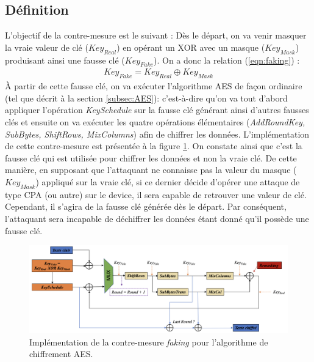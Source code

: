 \documentclass[oneside]{book}
\begin{document}
\subsection{Définition}
\label{subsec:def}

\hspace{-0.5 cm}L'objectif de la contre-mesure est le suivant : Dès le départ, on va venir masquer la vraie valeur de clé ($Key_{Real}$) en opérant un XOR avec un masque ($Key_{Mask}$) produisant ainsi une fausse clé ($Key_{Fake}$). On a donc la relation (\ref{eqn:faking}) : 
\begin{gather}
	Key_{Fake} = Key_{Real} \oplus Key_{Mask}\label{eqn:faking}
\end{gather}
À partir de cette fausse clé, on va exécuter l'algorithme AES de façon ordinaire (tel que décrit à la section \ref{subsec:AES}): c'est-à-dire qu'on va tout d'abord appliquer l'opération \textit{KeySchedule} sur la fausse clé générant ainsi d'autres fausses clés et ensuite on va exécuter les quatre opérations élémentaires (\textit{AddRoundKey, SubBytes, ShiftRows, MixColumns}) afin de chiffrer les données. L'implémentation de cette contre-mesure est présentée à la figure \ref{fig:ConceptFaking}. On constate ainsi que c'est la fausse clé qui est utilisée pour chiffrer les données et non la vraie clé. De cette manière, en supposant que l'attaquant ne connaisse pas la valeur du masque ($Key_{Mask}$) appliqué sur la vraie clé, si ce dernier décide d'opérer une attaque de type CPA (ou autre) sur le device, il sera capable de retrouver une valeur de clé. Cependant, il s'agira de la fausse clé générée dès le départ. Par conséquent, l'attaquant sera incapable de déchiffrer les données étant donné qu'il possède une fausse clé. \\

\begin{figure}[htbp]
    \hspace{-1.4cm}
    \includegraphics[scale=0.52]{image/ConceptFaking}
    \caption{Implémentation de la contre-mesure \textit{faking} pour l'algorithme de chiffrement AES.}
    \label{fig:ConceptFaking} 
\end{figure}
\end{document}
